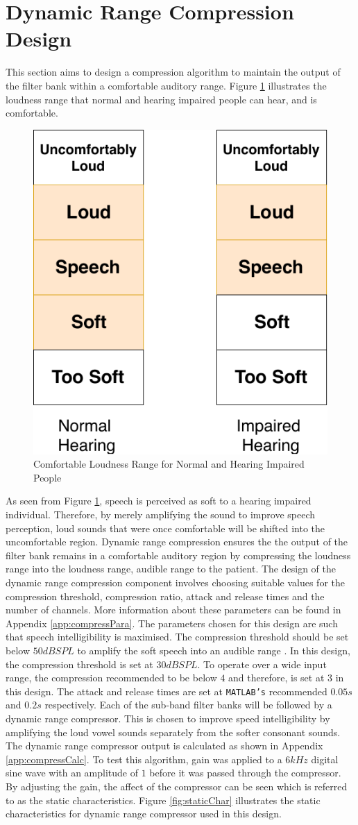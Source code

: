 \documentclass[11pt,onecolumn]{witseiepaper}
\begin{document}
\section{Dynamic Range Compression Design}
\label{sec:dynamicCompress}

\noindent This section aims to design a compression algorithm to maintain the output of the filter bank within a comfortable auditory range. Figure \ref{fig:loud} illustrates the loudness range that normal and hearing impaired people can hear, and is comfortable. 

\begin{figure}[h]
\centering
\includegraphics[width=0.35\linewidth]{loud.pdf}
\caption{Comfortable Loudness Range for Normal and Hearing Impaired People}
\label{fig:loud}
\end{figure} 

\noindent As seen from Figure \ref{fig:loud}, speech is perceived as soft to a hearing impaired individual. Therefore, by merely amplifying the sound to improve speech perception, loud sounds that were once comfortable will be shifted into the uncomfortable region. Dynamic range compression ensures the the output of the filter bank remains in a comfortable auditory region by compressing the loudness range into the loudness range, audible range to the patient. The design of the dynamic range compression component involves choosing suitable values for the compression threshold, compression ratio, attack and release times and the number of channels. More information about these parameters can be found in Appendix \ref{app:compressPara}. The parameters chosen for this design are such that speech intelligibility is maximised. The compression threshold should be set below $50dBSPL$ to amplify the soft speech into an audible range \cite{compressHand}. In this design, the compression threshold is set at $30dBSPL$. To operate over a wide input range, the compression recommended to be below $4$ and therefore, is set at $3$ in this design. The attack and release times are set at \texttt{MATLAB's} recommended $0.05s$ and $0.2s$ respectively. Each of the sub-band filter banks will be followed by a dynamic range compressor. This is chosen to improve speed intelligibility by amplifying the loud vowel sounds separately from the softer consonant sounds. The dynamic range compressor output is calculated as shown in Appendix \ref{app:compressCalc}. To test this algorithm, gain was applied to a $6kHz$ digital sine wave with an amplitude of $1$ before it was passed through the compressor. By adjusting the gain, the affect of the compressor can be seen which is referred to as the static characteristics. Figure \ref{fig:staticChar} illustrates the static characteristics for dynamic range compressor used in this design.
\end{document}
